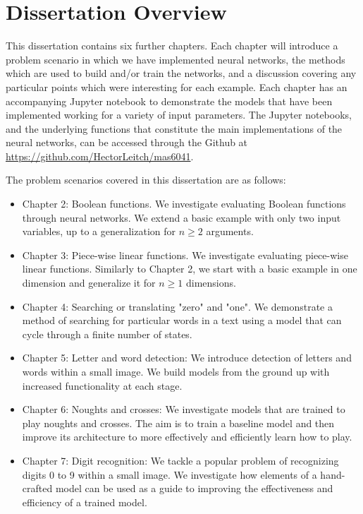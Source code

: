 \documentclass{somasmsc}
\begin{document}
\section{Dissertation Overview}

This dissertation contains six further chapters. Each chapter will introduce a problem scenario in which we have implemented neural networks, the methods which are used to build and/or train the networks, and a discussion covering any particular points which were interesting for each example. Each chapter has an accompanying Jupyter notebook to demonstrate the models that have been implemented working for a variety of input parameters. The Jupyter notebooks, and the underlying functions that constitute the main implementations of the neural networks, can be accessed through the Github at \url{https://github.com/HectorLeitch/mas6041}.

The problem scenarios covered in this dissertation are as follows:
\begin{itemize}
    \item Chapter 2: Boolean functions. We investigate evaluating Boolean functions through neural networks. We extend a basic example with only two input variables, up to a generalization for $n \geq 2$ arguments.
    \item Chapter 3: Piece-wise linear functions. We investigate evaluating piece-wise linear functions. Similarly to Chapter 2, we start with a basic example in one dimension and generalize it for $n \geq 1$ dimensions.
    \item Chapter 4: Searching or translating "zero" and "one". We demonstrate a method of searching for particular words in a text using a model that can cycle through a finite number of states.
    \item Chapter 5: Letter and word detection: We introduce detection of letters and words within a small image. We build models from the ground up with increased functionality at each stage.
    \item Chapter 6: Noughts and crosses: We investigate models that are trained to play noughts and crosses. The aim is to train a baseline model and then improve its architecture to more effectively and efficiently learn how to play.
    \item Chapter 7: Digit recognition: We tackle a popular problem of recognizing digits 0 to 9 within a small image. We investigate how elements of a hand-crafted model can be used as a guide to improving the effectiveness and efficiency of a trained model.
\end{itemize}
\end{document}
